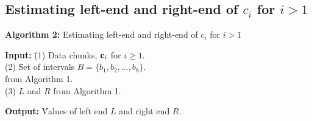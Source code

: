 \documentclass[a4paper,fleqn]{cas-dc}
\begin{document}
\subsection{Estimating left-end and right-end of $c_{i}$ for $i > 1$}
\vspace{0.2in}
\noindent
{\bf Algorithm 2:} Estimating left-end and right-end of $c_{i}$ for $i > 1$ %
\begin{tabbing}
{\bf Input: } \= (1) Data chunks, ${\bf c}_{i}$ for $i \geq 1$.  \\
              \> (2) \= Set of intervals $B =\{b_{1}, b_{2}, \ldots, b_{8}\}$. \\
              \>     \> from Algorithm 1. \\
              \> (3) $L$ and $R$ from Algorithm 1.
\end{tabbing}
\begin{tabbing}
{\bf Output: }\= Values of left end $L$ and right end $R$.          
\end{tabbing}
\end{document}
